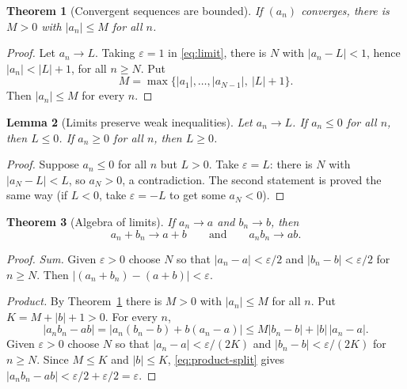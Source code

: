 \documentclass[11pt,a4paper]{book}
\newcommand{\abs}[1]{\left|#1\right|}
\numberwithin{equation}{section}          %
\theoremstyle{plain}
\newtheorem{theorem}{Theorem}[section]    %
\newtheorem{lemma}[theorem]{Lemma}
\theoremstyle{definition}
\theoremstyle{remark}
\begin{document}
\begin{theorem}[Convergent sequences are bounded]\label{thm:bounded}
If $(a_n)$ converges, there is $M>0$ with $\abs{a_n}\le M$ for all $n$.
\end{theorem}

\begin{proof}
Let $a_n\to L$. Taking $\varepsilon=1$ in \eqref{eq:limit}, there is $N$ with $\abs{a_n-L}<1$, hence $\abs{a_n}<\abs L+1$, for all $n\ge N$. Put
\[
    M=\max\{\abs{a_1},\ldots,\abs{a_{N-1}},\ \abs L+1\}.
\]
Then $\abs{a_n}\le M$ for every $n$.
\end{proof}

\begin{lemma}[Limits preserve weak inequalities]\label{lem:preserve}
Let $a_n\to L$. If $a_n\le0$ for all $n$, then $L\le0$. If $a_n\ge0$ for all $n$, then $L\ge0$.
\end{lemma}

\begin{proof}
Suppose $a_n\le0$ for all $n$ but $L>0$. Take $\varepsilon=L$: there is $N$ with $\abs{a_N-L}<L$, so $a_N>0$, a contradiction. The second statement is proved the same way (if $L<0$, take $\varepsilon=-L$ to get some $a_N<0$).
\end{proof}

\begin{theorem}[Algebra of limits]\label{thm:algebra}
If $a_n\to a$ and $b_n\to b$, then
\begin{equation}\label{eq:algebra}
    a_n+b_n\to a+b
    \qquad\text{and}\qquad
    a_nb_n\to ab .
\end{equation}
\end{theorem}

\begin{proof}
\emph{Sum.} Given $\varepsilon>0$ choose $N$ so that $\abs{a_n-a}<\varepsilon/2$ and $\abs{b_n-b}<\varepsilon/2$ for $n\ge N$. Then $\abs{(a_n+b_n)-(a+b)}<\varepsilon$.

\emph{Product.} By Theorem~\ref{thm:bounded} there is $M>0$ with $\abs{a_n}\le M$ for all $n$. Put $K=M+\abs b+1>0$. For every $n$,
\begin{equation}\label{eq:product-split}
    \abs{a_nb_n-ab}
    =\abs{a_n(b_n-b)+b(a_n-a)}
    \le M\abs{b_n-b}+\abs b\,\abs{a_n-a}.
\end{equation}
Given $\varepsilon>0$ choose $N$ so that $\abs{a_n-a}<\varepsilon/(2K)$ and $\abs{b_n-b}<\varepsilon/(2K)$ for $n\ge N$. Since $M\le K$ and $\abs b\le K$, \eqref{eq:product-split} gives $\abs{a_nb_n-ab}<\varepsilon/2+\varepsilon/2=\varepsilon$.
\end{proof}
\end{document}
